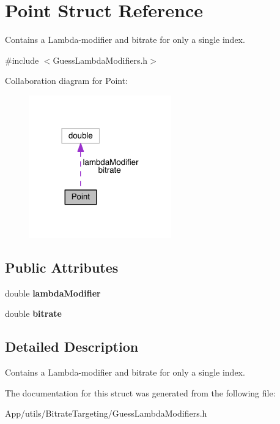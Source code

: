 \hypertarget{struct_point}{}\section{Point Struct Reference}
\label{struct_point}


Contains a Lambda-\/modifier and bitrate for only a single index.  




{\ttfamily \#include $<$Guess\+Lambda\+Modifiers.\+h$>$}



Collaboration diagram for Point\+:
\nopagebreak
\begin{figure}[H]
\begin{center}
\leavevmode
\includegraphics[width=174pt]{d6/d9a/struct_point__coll__graph}
\end{center}
\end{figure}
\subsection*{Public Attributes}
\begin{DoxyCompactItemize}
\item 
\mbox{\label{struct_point_a69c2c1efa78f61f04caa86ff16ab5869}} 
double {\bfseries lambda\+Modifier}
\item 
\mbox{\label{struct_point_af17bb2016efff077c827a5c0d4ea8d31}} 
double {\bfseries bitrate}
\end{DoxyCompactItemize}


\subsection{Detailed Description}
Contains a Lambda-\/modifier and bitrate for only a single index. 

The documentation for this struct was generated from the following file\+:\begin{DoxyCompactItemize}
\item 
App/utils/\+Bitrate\+Targeting/Guess\+Lambda\+Modifiers.\+h\end{DoxyCompactItemize}
